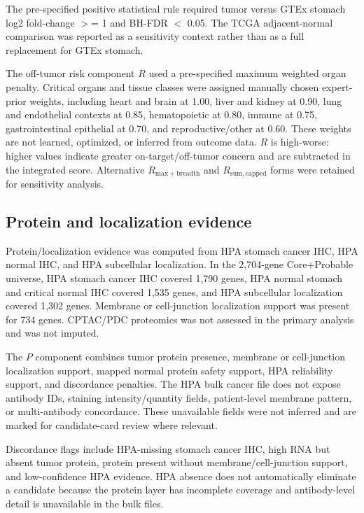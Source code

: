 \documentclass[review,12pt,authoryear]{elsarticle}
\begin{document}
The pre-specified positive statistical rule required tumor versus GTEx stomach log2 fold-change \ensuremath{>}= 1 and BH-FDR \ensuremath{<} 0.05. The TCGA adjacent-normal comparison was reported as a sensitivity context rather than as a full replacement for GTEx stomach.

The off-tumor risk component $R$ used a pre-specified maximum weighted organ penalty. Critical organs and tissue classes were assigned manually chosen expert-prior weights, including heart and brain at 1.00, liver and kidney at 0.90, lung and endothelial contexts at 0.85, hematopoietic at 0.80, immune at 0.75, gastrointestinal epithelial at 0.70, and reproductive/\allowbreak{}other at 0.60. These weights are not learned, optimized, or inferred from outcome data. $R$ is high-worse: higher values indicate greater on-target/\allowbreak{}off-tumor concern and are subtracted in the integrated score. Alternative $R_{\mathrm{max+breadth}}$ and $R_{\mathrm{sum,capped}}$ forms were retained for sensitivity analysis.

\subsection{Protein and localization evidence}

Protein/\allowbreak{}localization evidence was computed from HPA stomach cancer IHC, HPA normal IHC, and HPA subcellular localization. In the 2,704-gene Core+\allowbreak{}Probable universe, HPA stomach cancer IHC covered 1,790 genes, HPA normal stomach and critical normal IHC covered 1,535 genes, and HPA subcellular localization covered 1,302 genes. Membrane or cell-junction localization support was present for 734 genes. CPTAC/\allowbreak{}PDC proteomics was not assessed in the primary analysis and was not imputed.

The $P$ component combines tumor protein presence, membrane or cell-junction localization support, mapped normal protein safety support, HPA reliability support, and discordance penalties. The HPA bulk cancer file does not expose antibody IDs, staining intensity/\allowbreak{}quantity fields, patient-level membrane pattern, or multi-antibody concordance. These unavailable fields were not inferred and are marked for candidate-card review where relevant.

Discordance flags include HPA-missing stomach cancer IHC, high RNA but absent tumor protein, protein present without membrane/\allowbreak{}cell-junction support, and low-confidence HPA evidence. HPA absence does not automatically eliminate a candidate because the protein layer has incomplete coverage and antibody-level detail is unavailable in the bulk files.
\end{document}
